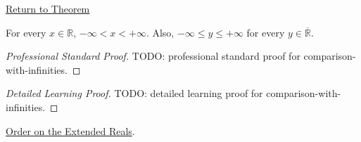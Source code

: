 \newpage
{}
\label{prf:comparison-with-infinities}
\begin{remark*}[Return]
\hyperref[thm:comparison-with-infinities]{Return to Theorem}
\end{remark*}
\begin{theorem*}
For every $x\in\mathbb{R}$, $-\infty<x<+\infty$. Also,
$-\infty\le y\le+\infty$ for every $y\in\overline{\mathbb{R}}$.
\end{theorem*}
\begin{proof}[Professional Standard Proof]
\LRAProofBodyStart
TODO: professional standard proof for comparison-with-infinities.
\end{proof}
\begin{proof}[Detailed Learning Proof]
\LRAProofBodyStart
TODO: detailed learning proof for comparison-with-infinities.
\end{proof}
\begin{remark*}
\end{remark*}
\begin{dependencies}
\hyperref[def:extended-real-order]{Order on the Extended Reals}.
\end{dependencies}
\clearpage

